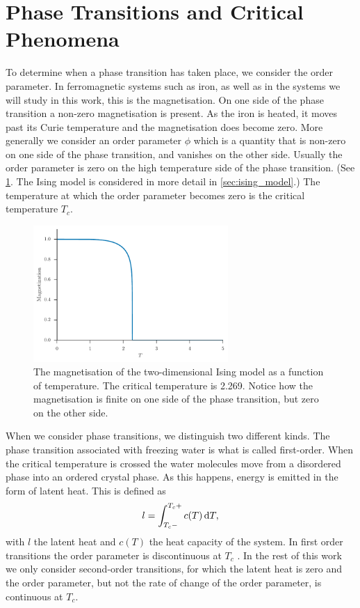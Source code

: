 \documentclass[11pt, a4paper]{report} %
\begin{document}
\section{Phase Transitions and Critical Phenomena}
To determine when a phase transition has taken place, we consider the order parameter.
In ferromagnetic systems such as iron, as well as in the systems we will study in this work, this is the magnetisation.
On one side of the phase transition a non-zero magnetisation is present.
As the iron is heated, it moves past its Curie temperature and the magnetisation does become zero.
More generally we consider an order parameter \(\phi\) which is a quantity that is non-zero on one side of the phase transition, and vanishes  on the other side. Usually the order parameter is zero on the high temperature side of the phase transition. (See \cref{fig:ising_magnetization}. The Ising model is considered in more detail in \cref{sec:ising_model}.)
The temperature at which the order parameter becomes zero is the critical temperature \(T_c\).
\begin{figure}[htb]
	\centering
	\includegraphics[width=0.66\textwidth]{ising_magnetization}
	\caption{The magnetisation of the two-dimensional Ising model as a function of temperature. The critical temperature is 2.269. Notice how the magnetisation is finite on one side of the phase transition, but zero on the other side.}
	\label{fig:ising_magnetization}
\end{figure}

When we consider phase transitions, we distinguish two different kinds.
The phase transition associated with freezing water is what is called first-order.
When the critical temperature is crossed the water molecules move from a disordered phase into an ordered crystal phase.
As this happens, energy is emitted in the form of latent heat.
This is defined as
\begin{equation}
	\label{eq:latent_heat}
	l = \int_{T_c-}^{T_c+} c(T) \dif T,
\end{equation}
with \(l\) the latent heat and \(c(T)\) the heat capacity of the system.
In first order transitions the order parameter is discontinuous at \(T_c\) \cite{binney:1992}.
In the rest of this work we only consider second-order transitions, for which the latent heat is zero and the order parameter, but not the rate of change of the order parameter, is continuous at \(T_c\).
\end{document}
